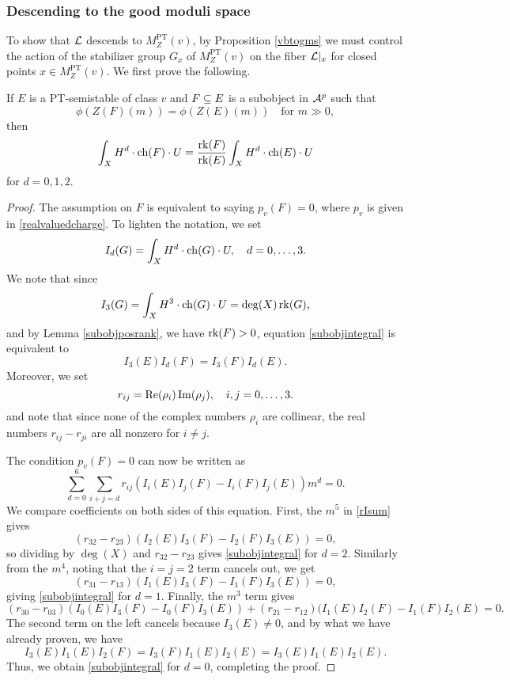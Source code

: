 \subsubsection{Descending to the good moduli space}
To show that $\mathcal{L}$ descends to $M^{\text{PT}}_Z(v)$, by Proposition \ref{vbtogms} we must control the action of the stabilizer group $G_x$ of $M^{\text{PT}}_Z(v)$ on the fiber $\mathcal{L}|_x$ for closed points $x \in M^{\text{PT}}_Z(v)$. We first prove the following.
\begin{lem}\label{subobjintlemma}
    If $E$ is a PT-semistable of class $v$ and $F \subseteq E$ is a subobject in $\mathcal{A}^p$ such that 
    \[ \phi(Z(F)(m)) = \phi(Z(E)(m)) \quad \text{for } m \gg 0, \]
    then
    \begin{equation}\label{subobjintegral}
         \int_X H^d \cdot \operatorname{\mathrm{ch}}(F) \cdot U = \frac{\operatorname{\mathrm{rk}}(F)}{\operatorname{\mathrm{rk}}(E)} \int_X H^d\cdot \operatorname{\mathrm{ch}}(E) \cdot U
    \end{equation}
    for $d = 0, 1, 2$.
\end{lem}
\begin{proof}
    The assumption on $F$ is equivalent to saying $p_v(F) = 0$, where $p_v$ is given in \eqref{realvaluedcharge}. To lighten the notation, we set
    \[ I_d(G) = \int_X H^d \cdot \operatorname{\mathrm{ch}}(G) \cdot U, \quad d = 0, \ldots, 3. \]
    We note that since
    \[ I_3(G) = \int_X H^3 \cdot \operatorname{\mathrm{ch}}(G) \cdot U = \deg(X) \operatorname{\mathrm{rk}}(G), \]
    and by Lemma \ref{subobjposrank}, we have $\operatorname{\mathrm{rk}}(F) > 0$, equation \eqref{subobjintegral} is equivalent to 
    \[ I_3(E) I_d(F) = I_3(F) I_d(E). \]
    Moreover, we set
    \[ r_{ij} = \operatorname{\mathrm{Re}}(\rho_i) \operatorname{\mathrm{Im}}(\rho_j), \quad i, j = 0, \ldots, 3. \]
    and note that since none of the complex numbers $\rho_i$ are collinear, the real numbers $r_{ij} - r_{ji}$ are all nonzero for $i \neq j$.
    
    The condition $p_v(F) = 0$ can now be written as
    \begin{equation}\label{rIsum}
        \sum_{d=0}^6 \sum_{i+j = d} r_{ij} ( I_i(E) I_j(F) - I_i(F) I_j(E)) m^d = 0.
    \end{equation}
    We compare coefficients on both sides of this equation. First, the $m^5$ in \eqref{rIsum} gives
    \[ (r_{32}-r_{23})(I_2(E) I_3(F) - I_2(F) I_3(E)) = 0, \]
    so dividing by $\deg(X)$ and $r_{32}-r_{23}$ gives \eqref{subobjintegral} for $d = 2$. Similarly from the $m^4$, noting that the $i = j =2$ term cancels out, we get
    \[ (r_{31}-r_{13})(I_1(E) I_3(F) - I_1(F) I_3(E)) = 0, \]
    giving \eqref{subobjintegral} for $d = 1$. Finally, the $m^3$ term gives
    \[ (r_{30}-r_{03})(I_0(E) I_3(F) - I_0(F) I_3(E)) + (r_{21}-r_{12})(I_1(E) I_2(F) - I_1(F) I_2(E) = 0. \]
    The second term on the left cancels because $I_3(E) \neq 0$, and by what we have already proven, we have
    \[ I_3(E) I_1(E) I_2(F) = I_3(F) I_1(E) I_2(E) = I_3(E) I_1(E) I_2(E). \]
    Thus, we obtain \eqref{subobjintegral} for $d = 0$, completing the proof.
\end{proof}

